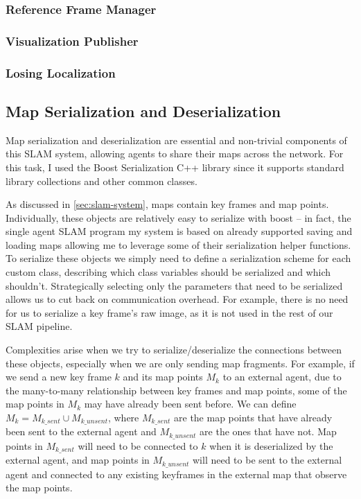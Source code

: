 \subsubsection{Reference Frame Manager}
\label{sec:reference-frame-manager}

\subsubsection{Visualization Publisher}
\label{sec:visualization-publisher}

\subsubsection{Losing Localization}
\label{sec:losing-localization}

\subsection{Map Serialization and Deserialization}
\label{sec:map-serialization-and-deserialization}
Map serialization and deserialization are essential and non-trivial components of this SLAM system, allowing agents to share their maps across the network. For this task, I used the Boost \autocite{boostLibrary} Serialization C++ library since it supports standard library collections and other common classes.

As discussed in \autoref{sec:slam-system}, maps contain key frames and map points. Individually, these objects are relatively easy to serialize with boost – in fact, the single agent SLAM program my system is based on already supported saving and loading maps allowing me to leverage some of their serialization helper functions. To serialize these objects we simply need to define a serialization scheme for each custom class, describing which class variables should be serialized and which shouldn't. Strategically selecting only the parameters that need to be serialized allows us to cut back on communication overhead. For example, there is no need for us to serialize a key frame's raw image, as it is not used in the rest of our SLAM pipeline.

Complexities arise when we try to serialize/deserialize the connections between these objects, especially when we are only sending map fragments. For example, if we send a new key frame $k$ and its map points $M_k$ to an external agent, due to the many-to-many relationship between key frames and map points, some of the map points in $M_k$ may have already been sent before. We can define $M_k = M_{k\_sent} \cup M_{k\_unsent}$, where $M_{k\_sent}$ are the map points that have already been sent to the external agent and $M_{k\_unsent}$ are the ones that have not. Map points in $M_{k\_sent}$ will need to be connected to $k$ when it is deserialized by the external agent, and map points in $M_{k\_unsent}$ will need to be sent to the external agent and connected to any existing keyframes in the external map that observe the map points.

